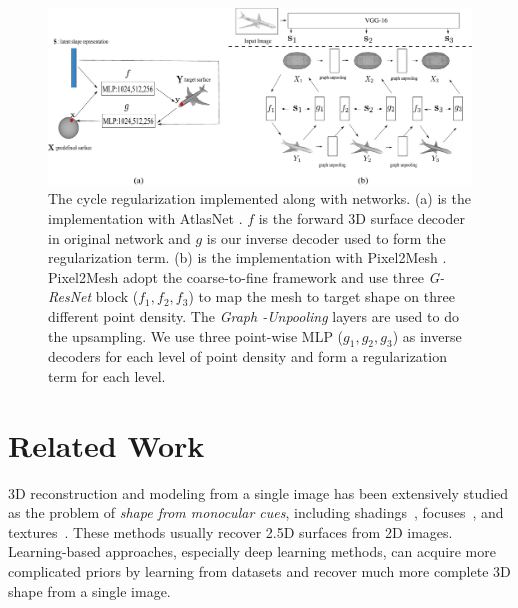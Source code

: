 \begin{figure}[t]
	\centering
	\includegraphics[width=\linewidth]{img/net/net}
	\caption{The cycle regularization implemented along with networks. (a) is the implementation with AtlasNet \cite{atlasnet}. $f$ is the forward 3D surface decoder in original network and $g$ is our inverse decoder used to form the regularization term. (b) is the implementation with Pixel2Mesh \cite{pixel2mesh}.  Pixel2Mesh \cite{pixel2mesh} adopt the coarse-to-fine framework and use three \emph{G-ResNet} block ($f_1,f_2,f_3$) to map the mesh to target shape on three different point density. The \emph{Graph -Unpooling} layers are used to do the upsampling. We use three point-wise MLP ($g_1,g_2,g_3$) as inverse decoders for each level of point density and form a regularization term for each level.}
	\label{fig:net}
\end{figure}

\section{Related Work}
3D reconstruction and modeling from a single image has been extensively studied as the problem of \emph{shape from monocular cues}, including shadings~\cite{shapefromshadingsurvey}, focuses~\cite{shapefromdf1,shapefromdf2}, and textures~\cite{Aloimonos1988}. 
These methods usually recover 2.5D surfaces from 2D images. 
Learning-based approaches, especially deep learning methods, can acquire more complicated priors by learning from datasets and recover much more complete 3D shape from a single image.
 
